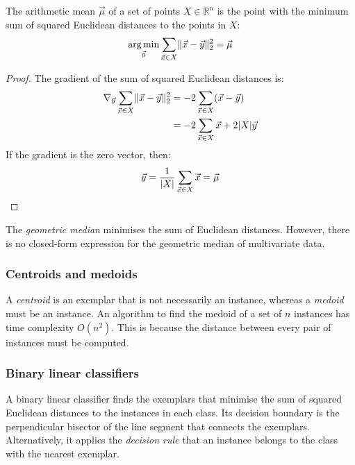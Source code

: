\begin{thm}
  The arithmetic mean $\vec{\mu}$ of a set of points $X \in \mathbb{R}^n$ is the
  point with the minimum sum of squared Euclidean distances to the points in $X$:
  \begin{equation}
    \operatorname*{arg\,min}_{\vec{y}} \sum_{\vec{x} \in X} \lVert \vec{x} - \vec{y} \rVert_{2}^{2} = \vec{\mu}
  \end{equation}
  \begin{proof}
    The gradient of the sum of squared Euclidean distances is:
    \begin{align*}
      \nabla_{\vec{y}} \sum_{\vec{x} \in X} \lVert \vec{x} - \vec{y} \rVert_{2}^{2}
       & = - 2 \sum_{\vec{x} \in X} (\vec{x} - \vec{y})
      \\
       & = - 2 \sum_{\vec{x} \in X} \vec{x} + 2 |X| \vec{y}
    \end{align*}
    If the gradient is the zero vector, then:
    \begin{equation*}
      \vec{y} = \frac{1}{|X|} \sum_{\vec{x} \in X} \vec{x} = \vec{\mu}
    \end{equation*}
  \end{proof}
\end{thm}

The \textit{geometric median} minimises the sum of Euclidean distances.
However, there is no closed-form expression for the geometric median of
multivariate data.

\subsubsection{Centroids and medoids}
\label{par:8:centroids-and-medoids}

A \textit{centroid} is an exemplar that is not necessarily an instance, whereas
a \textit{medoid} must be an instance.
An algorithm to find the medoid of a set of $n$ instances has time complexity
$O(n^2)$.
This is because the distance between every pair of instances must be computed.

\subsubsection{Binary linear classifiers}
\label{par:8:binary-linear-classifiers}

A binary linear classifier finds the exemplars that minimise the sum of squared
Euclidean distances to the instances in each class.
Its decision boundary is the perpendicular bisector of the line segment that
connects the exemplars.
Alternatively, it applies the \textit{decision rule} that an instance belongs
to the class with the nearest exemplar.

